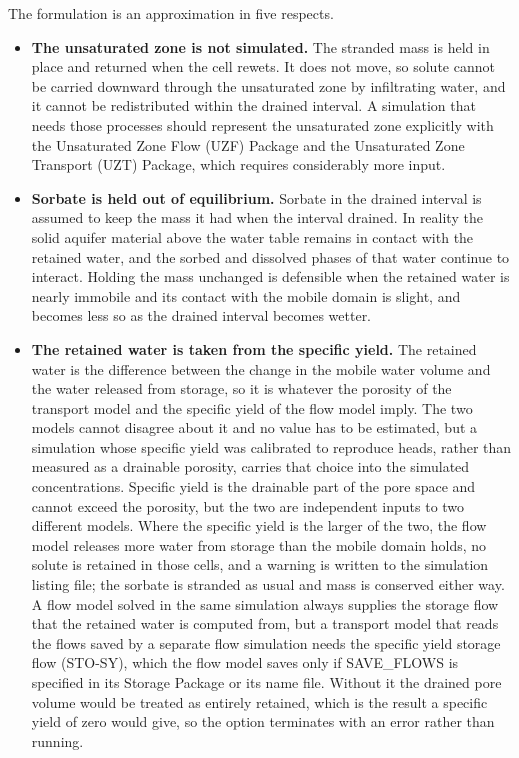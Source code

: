 The formulation is an approximation in five respects.

\begin{itemize}

\item \textbf{The unsaturated zone is not simulated.} The stranded mass is held in place and returned when the cell rewets. It does not move, so solute cannot be carried downward through the unsaturated zone by infiltrating water, and it cannot be redistributed within the drained interval. A simulation that needs those processes should represent the unsaturated zone explicitly with the Unsaturated Zone Flow (UZF) Package and the Unsaturated Zone Transport (UZT) Package, which requires considerably more input.

\item \textbf{Sorbate is held out of equilibrium.} Sorbate in the drained interval is assumed to keep the mass it had when the interval drained. In reality the solid aquifer material above the water table remains in contact with the retained water, and the sorbed and dissolved phases of that water continue to interact. Holding the mass unchanged is defensible when the retained water is nearly immobile and its contact with the mobile domain is slight, and becomes less so as the drained interval becomes wetter.

\item \textbf{The retained water is taken from the specific yield.} The retained water is the difference between the change in the mobile water volume and the water released from storage, so it is whatever the porosity of the transport model and the specific yield of the flow model imply. The two models cannot disagree about it and no value has to be estimated, but a simulation whose specific yield was calibrated to reproduce heads, rather than measured as a drainable porosity, carries that choice into the simulated concentrations. Specific yield is the drainable part of the pore space and cannot exceed the porosity, but the two are independent inputs to two different models. Where the specific yield is the larger of the two, the flow model releases more water from storage than the mobile domain holds, no solute is retained in those cells, and a warning is written to the simulation listing file; the sorbate is stranded as usual and mass is conserved either way. A flow model solved in the same simulation always supplies the storage flow that the retained water is computed from, but a transport model that reads the flows saved by a separate flow simulation needs the specific yield storage flow (STO-SY), which the flow model saves only if SAVE\_FLOWS is specified in its Storage Package or its name file. Without it the drained pore volume would be treated as entirely retained, which is the result a specific yield of zero would give, so the option terminates with an error rather than running.


\end{itemize}
